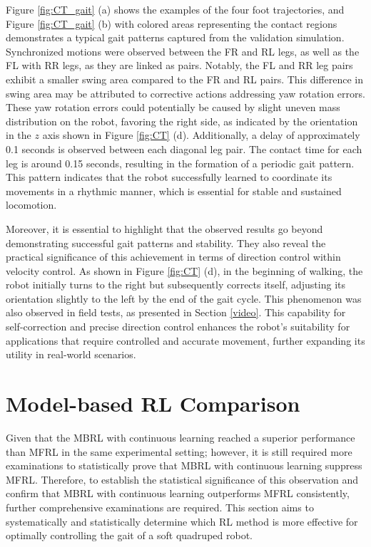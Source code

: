 Figure \ref{fig:CT_gait} (a) shows the examples of the four foot trajectories, and Figure \ref{fig:CT_gait} (b) with colored areas representing the contact regions demonstrates a typical gait patterns captured from the validation simulation. Synchronized motions were observed between the FR and RL legs, as well as the FL with RR legs, as they are linked as pairs. Notably, the FL and RR leg pairs exhibit a smaller swing area compared to the FR and RL pairs. This difference in swing area may be attributed to corrective actions addressing yaw rotation errors. These yaw rotation errors could potentially be caused by slight uneven mass distribution on the robot, favoring the right side, as indicated by the orientation in the $z$ axis shown in Figure \ref{fig:CT} (d). Additionally, a delay of approximately 0.1 seconds is observed between each diagonal leg pair. The contact time for each leg is around 0.15 seconds, resulting in the formation of a periodic gait pattern. This pattern indicates that the robot successfully learned to coordinate its movements in a rhythmic manner, which is essential for stable and sustained locomotion.



Moreover, it is essential to highlight that the observed results go beyond demonstrating successful gait patterns and stability. They also reveal the practical significance of this achievement in terms of direction control within velocity control. As shown in Figure \ref{fig:CT} (d), in the beginning of walking, the robot initially turns to the right but subsequently corrects itself, adjusting its orientation slightly to the left by the end of the gait cycle. This phenomenon was also observed in field tests, as presented in Section \ref{video}. This capability for self-correction and precise direction control enhances the robot's suitability for applications that require controlled and accurate movement, further expanding its utility in real-world scenarios. 

\section{Model-based RL Comparison}
\label{Sec:MBRL}
Given that the MBRL with continuous learning reached a superior performance than MFRL in the same experimental setting; however, it is still required more examinations to statistically prove that MBRL with continuous learning suppress MFRL. Therefore, to establish the statistical significance of this observation and confirm that MBRL with continuous learning outperforms MFRL consistently, further comprehensive examinations are required. This section aims to systematically and statistically determine which RL method is more effective for optimally controlling the gait of a soft quadruped robot. 

